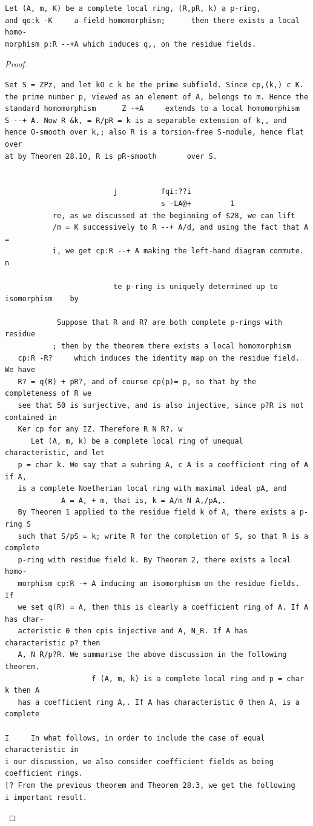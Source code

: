\begin{theorem}\label{mcrt-auto-theorem-29-2}\uses{}
\begin{verbatim}
Let (A, m, K) be a complete local ring, (R,pR, k) a p-ring,
and qo:k -K     a field homomorphism;      then there exists a local homo-
morphism p:R --+A which induces q,, on the residue fields.
\end{verbatim}
\end{theorem}
\begin{proof}
\begin{verbatim}
Set S = ZPz, and let kO c k be the prime subfield. Since cp,(k,) c K.
the prime number p, viewed as an element of A, belongs to m. Hence the
standard homomorphism      Z -+A     extends to a local homomorphism
S --+ A. Now R &k, = R/pR = k is a separable extension of k,, and
hence O-smooth over k,; also R is a torsion-free S-module, hence flat over
at by Theorem 28.10, R is pR-smooth       over S.


                         j          fqi:??i
                                    s -LA@+         1
           re, as we discussed at the beginning of $28, we can lift
           /m = K successively to R --+ A/d, and using the fact that A =
           i, we get cp:R --+ A making the left-hand diagram commute.  n

                         te p-ring is uniquely determined up to isomorphism    by

            Suppose that R and R? are both complete p-rings with residue
           ; then by the theorem there exists a local homomorphism
   cp:R -R?     which induces the identity map on the residue field. We have
   R? = q(R) + pR?, and of course cp(p)= p, so that by the completeness of R we
   see that 50 is surjective, and is also injective, since p?R is not contained in
   Ker cp for any IZ. Therefore R N R?. w
      Let (A, m, k) be a complete local ring of unequal characteristic, and let
   p = char k. We say that a subring A, c A is a coefficient ring of A if A,
   is a complete Noetherian local ring with maximal ideal pA, and
             A = A, + m, that is, k = A/m N A,/pA,.
   By Theorem 1 applied to the residue field k of A, there exists a p-ring S
   such that S/pS = k; write R for the completion of S, so that R is a complete
   p-ring with residue field k. By Theorem 2, there exists a local homo-
   morphism cp:R -+ A inducing an isomorphism on the residue fields. If
   we set q(R) = A, then this is clearly a coefficient ring of A. If A has char-
   acteristic 0 then cpis injective and A, N_R. If A has characteristic p? then
   A, N R/p?R. We summarise the above discussion in the following theorem.
                    f (A, m, k) is a complete local ring and p = char k then A
   has a coefficient ring A,. If A has characteristic 0 then A, is a complete

I     In what follows, in order to include the case of equal characteristic in
i our discussion, we also consider coefficient fields as being coefficient rings.
[? From the previous theorem and Theorem 28.3, we get the following
i important result.
\end{verbatim}
\end{proof}


